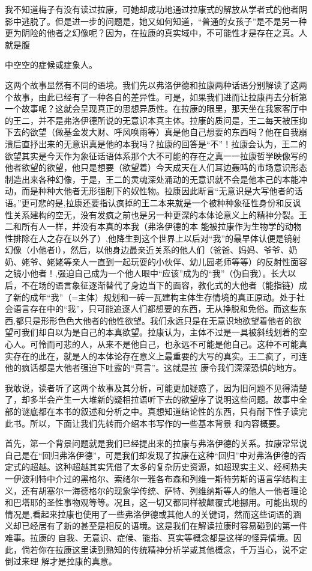 \documentclass{article}
\begin{document}
我不知道梅子有没有读过拉康，可她却成功地通过拉康式的解放从学者式的他者阴影中逃脱了。但是进一步的问题是，她又如何知道，“普通的女孩子”是不是另一种更为阴险的他者之幻像呢？因为，在拉康的真实域中，不可能性才是存在之真。人就是腹

\newpage
中空空的症候或症象人。 

这两个故事显然有不同的语境。我们先以弗洛伊德和拉康两种话语分别解读了这两个故事，由此已经有了一种各自的差异性。可是，如果我们进而让拉康再去分析第一个故事呢？这就会呈现真正的思想异质性。在拉康的眼里，那天坐在我家客厅中的王二，并不是弗洛伊德所说的无意识本真主体。拉康的质问是，王二每天被压抑下去的欲望（做基金发大财、呼风唤雨等）真是他自己想要的东西吗？他在自我崩溃后直抒出来的无意识真是他的本我吗？拉康的回答是“不”！拉康会认为，王二的欲望其实是今天作为象征话语体系那个大不可能的存在之真一一拉康哲学映像写的他者欲望的欲望，他只是想要（欲望着）今天成天在人们耳边轰鸣的市场意识形态制造出来各种幻像，于是，王二的灵魂深处涌动的无意识就不会是他本己的本能冲动，而是种种大他者无形强制下的奴性物。拉康因此断言“无意识是大写他者的话语。”更可悲的是,拉康还要指认疯掉的王二本来就是一个被种种象征性身份和反讽性关系建构的空无，没有发疯之前也是另一种更深的本体论意义上的精神分裂。王二和所有人一样，并没有本真的本我（弗洛伊德的本
\newpage
能被拉康作为生物学的动物性排除在人之存在以外了）,他降生到这个世界上以后对“我”的最早体认便是镜射幻像（小他者Ⅰ），然后，以他身边最亲近关系的他人们（爸爸、妈妈、爷爷、奶奶、姥爷、姥姥等亲人一直到一起玩耍的小伙伴、幼儿园老师等等）的反射性面容之镜小他者！,强迫自己成为一个他人眼中“应该”成为的“我”（伪自我）。长大以后，不在场的语言象征逐渐替代了身边当下的面容，教化式的大他者（能指链）成了新的成年“我”（=主体）规划和一砖一瓦建构主体生存情境的真正原动。处于社会语言存在中的“我”，只可能追逐人们都想要的东西，无从挣脱和免俗。而这些东西,都只是形形色色大他者的他性欲望。我们永远只是在无意识地欲望着他者的欲望可我们却自以为是自己的本真欲望。拉康认为，主体不过是一具被斜线划着的空心人。可怜而可悲的人，从来不是他自己，也永远不可能是他自己。这种不可能真实存在的此在，就是人的本体论存在意义上最重要的大写的真实。王二疯了，可连他的疯话都是大他者强迫下吐露的“真言”。这就是拉
康令我们深深恐惧的地方。 

\newpage

我敢说，读者听了这两个故事及其分析，可能更加疑惑了，因为旧问题不见得清楚了，却多半会产生一大堆新的疑相拉语听下去的欲望序了说明这些问题。故事中全部的谜底都在本书的叙述和分析之中。真想知道结论性的东西，只有耐下性子读完此书。所以，下面让我们先转而介绍本书写作的一些基本背景
和内容概要。 

首先，第一个背景问题就是我们已经提出来的拉康与弗洛伊德的关系。拉康常常说自己是在“回归弗洛伊德”，可是我们却发现了拉康在这种“回归”中对弗洛伊德的否定式的超越。这种超越其实凭借了太多的复杂历史资源，如超现实主义、经柯热夫一伊波利特中介过的黑格尔、索绪尔一雅各布森和列维一斯特劳斯的语言学结构主义，还有胡塞尔一海德格尔的现象学传统、萨特、列维纳斯等人的他人一他者理论和巴塔耶的圣性事物观等等。况且，这一切又都同样被颠覆式地挪用。可能出现的情况是,看起来拉康也使用了一些弗洛伊德或其他人的关键词，然而这些词语的涵义却已经居有了新的甚至是相反的语境。这是我们在解读拉康时容易碰到的第一件难事。拉康的
\newpage
自我、无意识、症候、能指、真实等概念都是这样的怪异情境。因此，倘若你在拉康这里读到熟知的传统精神分析学或其他概念，千万当心，说不定倒过来理
解才是拉康的真意。 
\end{document}
